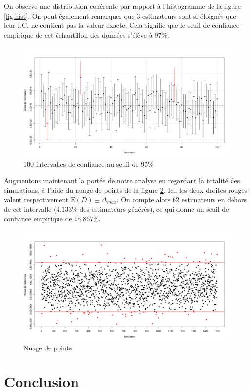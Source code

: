 \documentclass[paper=a4, fontsize=11pt]{scrartcl}
\begin{document}
On observe une distribution cohérente par rapport à l'histogramme de la figure \ref{fig:hist}. On peut également remarquer que 3 estimateurs sont si éloignés que leur I.C. ne contient pas la valeur exacte. Cela signifie que le seuil de confiance empirique de cet échantillon des données s'élève à 97\%.

\begin{figure}[h!]
  \centering
  \includegraphics[scale=0.46]{../analysis/plots/CIplot.pdf}
  \caption{100 intervalles de confiance au seuil de 95\%}
  \label{fig:CIPlot}
\end{figure}

Augmentons maintenant la portée de notre analyse en regardant la totalité des simulations, à l'aide du nuage de points de la figure \ref{fig:PointsCloud}. Ici, les deux droites rouges valent respectivement $\text{E}(D) \pm \Delta_{max}$. On compte alors 62 estimateurs en dehors de cet intervalle (4.133\% des estimateurs générés), ce qui donne un seuil de confiance empirique de 95.867\%.

\begin{figure}[h!]
  \centering
  \includegraphics[scale=0.46]{../analysis/plots/PointsCloud.pdf}
  \caption{Nuage de points}
  \label{fig:PointsCloud}
\end{figure}

\section{Conclusion}
\end{document}
